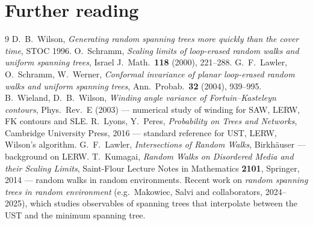 \documentclass[11pt]{article}
\theoremstyle{definition}
\theoremstyle{plain}
\begin{document}
\section*{Further reading}
\small
\begin{thebibliography}{9}
 D.~B.~Wilson, \emph{Generating random spanning trees more
quickly than the cover time}, STOC 1996.
 O.~Schramm, \emph{Scaling limits of loop-erased random walks
and uniform spanning trees}, Israel J.\ Math.\ \textbf{118} (2000), 221--288.
 G.~F.~Lawler, O.~Schramm, W.~Werner, \emph{Conformal invariance of
planar loop-erased random walks and uniform spanning trees}, Ann.\ Probab.\
\textbf{32} (2004), 939--995.
 B.~Wieland, D.~B.~Wilson, \emph{Winding angle variance of
Fortuin--Kasteleyn contours}, Phys.\ Rev.\ E (2003) --- numerical study of
winding for SAW, LERW, FK contours and SLE.
 R.~Lyons, Y.~Peres, \emph{Probability on Trees and
Networks}, Cambridge University Press, 2016 --- standard reference for UST,
LERW, Wilson's algorithm.
 G.~F.~Lawler, \emph{Intersections of Random Walks},
Birkh\"auser --- background on LERW.
 T.~Kumagai, \emph{Random Walks on Disordered Media and their
Scaling Limits}, Saint-Flour Lecture Notes in Mathematics \textbf{2101},
Springer, 2014 --- random walks in random environments.
 Recent work on \emph{random spanning trees in random
environment} (e.g.\ Makowiec, Salvi and collaborators, 2024--2025), which
studies observables of spanning trees that interpolate between the UST and the
minimum spanning tree.
\end{thebibliography}
\end{document}
